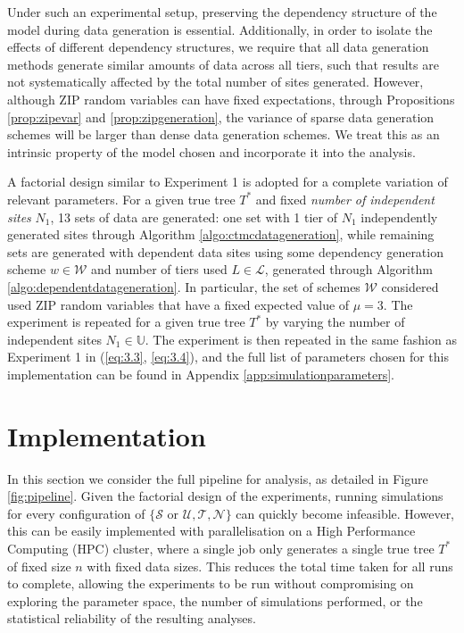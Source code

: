 Under such an experimental setup, preserving the dependency structure of the model during data generation is essential. Additionally, in order to isolate the effects of different dependency structures, we require that all data generation methods generate similar amounts of data across all tiers, such that results are not systematically affected by the total number of sites generated. However, although ZIP random variables can have fixed expectations, through Propositions \ref{prop:zipevar} and \ref{prop:zipgeneration}, the variance of sparse data generation schemes will be larger than dense data generation schemes. We treat this as an intrinsic property of the model chosen and incorporate it into the analysis.

A factorial design similar to Experiment 1 is adopted for a complete variation of relevant parameters. For a given true tree $T^*$ and fixed \textit{number of independent sites} $N_1$, 13 sets of data are generated: one set with 1 tier of $N_1$ independently generated sites through Algorithm \ref{algo:ctmcdatageneration}, while remaining sets are generated with dependent data sites using some dependency generation scheme $w \in \mathcal{W}$ and number of tiers used $L \in \mathcal{L}$, generated through Algorithm \ref{algo:dependentdatageneration}. In particular, the set of schemes $\mathcal{W}$ considered used ZIP random variables that have a fixed expected value of $\mu = 3$. The experiment is repeated for a given true tree $T^*$ by varying the number of independent sites $N_1 \in \mathbb{U}$. The experiment is then repeated in the same fashion as Experiment 1 in (\ref{eq:3.3}, \ref{eq:3.4}), and the full list of parameters chosen for this implementation can be found in Appendix \ref{app:simulationparameters}.

\section{Implementation}

In this section we consider the full pipeline for analysis, as detailed in Figure \ref{fig:pipeline}. Given the factorial design of the experiments, running simulations for every configuration of $\{\mathcal{S} \text{ or }  \mathcal{U}, \mathcal{T}, \mathcal{N}\}$ can quickly become infeasible. However, this can be easily implemented with parallelisation on a High Performance Computing (HPC) cluster, where a single job only generates a single true tree $T^*$ of fixed size $n$ with fixed data sizes. This reduces the total time taken for all runs to complete, allowing the experiments to be run without compromising on exploring the parameter space, the number of simulations performed, or the statistical reliability of the resulting analyses.

